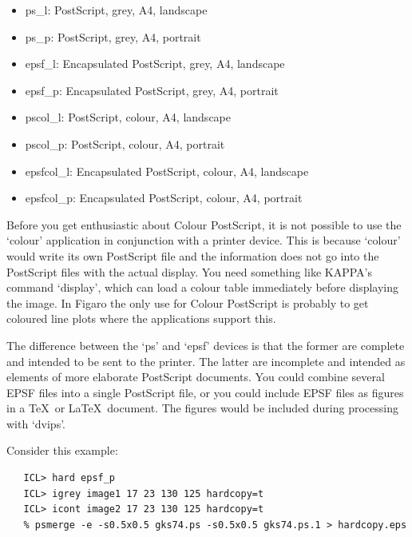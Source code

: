 \documentclass[11pt,twoside]{article}
\begin{document}
\begin{itemize}
\item   ps\_l: PostScript, grey, A4, landscape
\item   ps\_p: PostScript, grey, A4, portrait
\item   epsf\_l: Encapsulated PostScript, grey, A4, landscape
\item   epsf\_p: Encapsulated PostScript, grey, A4, portrait
\item   pscol\_l: PostScript, colour, A4, landscape
\item   pscol\_p: PostScript, colour, A4, portrait
\item   epsfcol\_l: Encapsulated PostScript, colour, A4, landscape
\item   epsfcol\_p: Encapsulated PostScript, colour, A4, portrait
\end{itemize}

   Before you get enthusiastic about Colour PostScript, it is not
   possible to use the `colour' application in conjunction with a
   printer device. This is because `colour' would write its own
   PostScript file and the information does not go into the PostScript
   files with the actual display. You need something like KAPPA's
   command `display', which can load a colour table immediately before
   displaying the image. In Figaro the only use for Colour PostScript is
   probably to get coloured line plots where the applications support
   this.

   The difference between the `ps' and `epsf' devices is that the former
   are complete and intended to be sent to the printer. The latter are
   incomplete and intended as elements of more elaborate PostScript
   documents. You could combine several EPSF files into a single
   PostScript file, or you could include EPSF files as figures in a
   \TeX\ or \LaTeX\ document. The figures would be included during
   processing with `dvips'.

   Consider this example:

\begin{verbatim}
   ICL> hard epsf_p
   ICL> igrey image1 17 23 130 125 hardcopy=t
   ICL> icont image2 17 23 130 125 hardcopy=t
   % psmerge -e -s0.5x0.5 gks74.ps -s0.5x0.5 gks74.ps.1 > hardcopy.eps
\end{verbatim}
\end{document}
